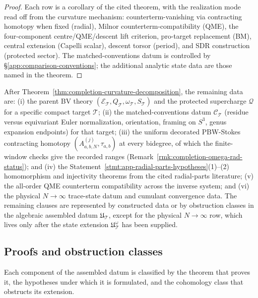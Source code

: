 \begin{proof}
Each row is a corollary of the cited theorem, with the realization
mode read off from the curvature mechanism: counterterm-vanishing
via contracting homotopy when fixed (radial), Milnor counterterm-compatibility
(QME), the four-component centre/QME/descent lift criterion,
pro-target replacement
(BM), central extension (Capelli scalar), descent torsor (period), and SDR
construction (protected sector).  The
matched-conventions datum is controlled by
\S\ref{app:comparison-conventions}; the additional analytic state data
are those named in the theorem.
\end{proof}

\begin{rmk}
\label{rmk:completion-remaining-data}
After Theorem~\ref{thm:completion-curvature-decomposition}, the remaining data are:
(i) the parent BV theory
\((\mathcal E_{\mathcal T},Q_{\mathcal T},\omega_{\mathcal T},
S_{\mathcal T})\) and the protected supercharge \(\mathcal Q\) for
a specific compact target \(\mathcal T\); (ii) the
matched-conventions datum \(\mathcal C_{\mathcal T}\) (residue
versus equivariant Euler normalization, orientation, framing on
\(S^3\), genus expansion endpoints) for that target;
(iii) the uniform decorated PBW-Stokes contracting homotopy
\((A^{(j)}_{a,b,N},\tau_{a,b})\) at every bidegree, of which the
finite-window checks give the recorded ranges
(Remark~\ref{rmk:completion-omega-rad-status}); and (iv) the
Statement~\ref{stmt:app-radial-parts-hypotheses}(1)--(2)
homomorphism and injectivity theorems from the cited radial-parts
literature; (v) the all-order QME counterterm compatibility across the
inverse system; and (vi) the physical \(N\to\infty\) trace-state datum and cumulant
convergence data.
The remaining clauses are represented by constructed data or by
obstruction classes in the algebraic assembled datum
\(\mathfrak U_{\mathcal T}\), except for the physical \(N\to\infty\) row,
which lives only after the state extension \(\mathfrak U^\omega_{\mathcal T}\)
has been supplied.
\end{rmk}

\subsection{Proofs and obstruction classes}
\label{ssec:completion-construction-status}

Each component of the assembled datum is classified by the theorem that
proves it, the hypotheses under which it is formulated, and the
cohomology class that obstructs its extension.

